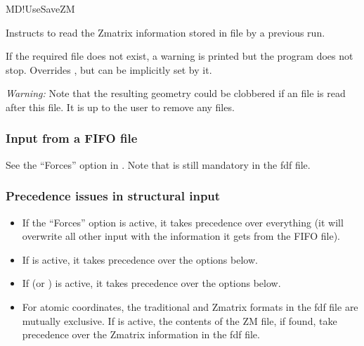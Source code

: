\begin{fdflogicalF}{MD!UseSaveZM}

  Instructs to read the Zmatrix information stored
  in file  by a previous run.

  If the required file does not exist, a warning is
  printed but the program does not stop. Overrides ,
  but can be implicitly set by it.
  
  \textit{Warning:} Note that the resulting geometry could be clobbered if
  an  file is read after this file. It is up to the user to remove
  any  files.
  
\end{fdflogicalF}



\subsubsection{Input from a FIFO file}

See the ``Forces'' option in . Note that
 is still mandatory in the fdf file.

\subsubsection{Precedence issues in structural input}

\begin{itemize}
  \item If the ``Forces'' option is active, it takes precedence over
  everything (it will overwrite all other input with the information it
  gets from the FIFO file).

  \item If  is active, it takes precedence over the options below.

  \item If  (or ) is active, it takes precedence
  over the options below.

  \item For atomic coordinates, the traditional and Zmatrix formats in
  the fdf file are mutually exclusive. If  is
  active, the contents of the ZM file, if found, take precedence over
  the Zmatrix information in the fdf file.

\end{itemize}

